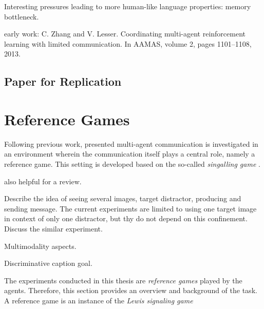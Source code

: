 Interesting pressures leading to more human-like language properties: memory bottleneck. 

early work: C. Zhang and V. Lesser. Coordinating multi-agent reinforcement learning with limited communication. In AAMAS, volume 2, pages 1101–1108, 2013.


\subsection{Paper for Replication}



\section{Reference Games}

Following previous work, presented multi-agent communication is investigated in an environment wherein the communication itself plays a central role, namely a reference game. This setting is developed based on the so-called \textit{singalling game} \parencite[e.g.,][]{lewis1969convention, skyrms2010signals} . 

\cite{lazaridou2018emergence} also helpful for a review.

Describe the idea of seeing several images, target distractor, producing and sending message.
The current experiments are limited to using one target image in context of only one distractor, but thy do not depend on this confinement.
Discuss the similar experiment. 

Multimodality aspects.

Discriminative caption goal.

The experiments conducted in this thesis are \textit{reference games} played by the agents. Therefore, this section provides an overview and background of the task. 
A reference game is an instance of the \textit{Lewis signaling game} 